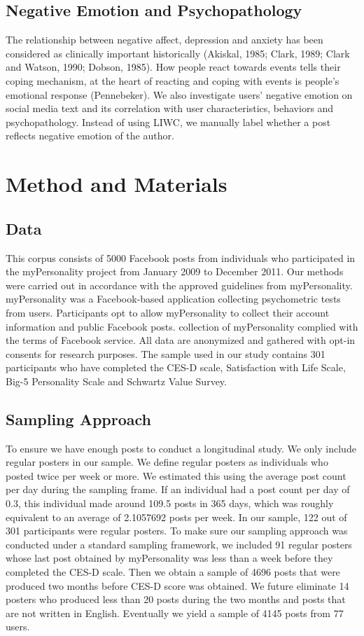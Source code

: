 \subsection{Negative Emotion and Psychopathology}

The relationship between negative affect, depression and anxiety has been considered as clinically important historically (Akiskal, 1985; Clark, 1989; Clark and Watson, 1990; Dobson, 1985). How people react towards events tells their coping mechanism, at the heart of reacting and coping with events is people's emotional response (Pennebeker). We also investigate users' negative emotion on social media text and its correlation with user characteristics, behaviors and psychopathology. Instead of using LIWC, we manually label whether a post reflects negative emotion of the author. 

\section{Method and Materials}
\subsection{Data}
This corpus consists of 5000 Facebook posts from individuals who participated in the myPersonality project from January 2009 to December 2011. Our methods were carried out in accordance with the approved guidelines from myPersonality. myPersonality was a Facebook-based application collecting psychometric tests from users. Participants opt to allow myPersonality to collect their account information and public Facebook posts. collection of myPersonality complied with the terms of Facebook service. All data are anonymized and gathered with opt-in consents for research purposes. The sample used in our study contains 301 participants who have completed the CES-D scale, Satisfaction with Life Scale, Big-5 Personality Scale and Schwartz Value Survey. 

\subsection{Sampling Approach}
To ensure we have enough posts to conduct a longitudinal study. We only include regular posters in our sample. We define regular posters as individuals who posted twice per week or more. We estimated this using the average post count per day during the sampling frame. If an individual had a post count per day of 0.3, this individual made around 109.5 posts in 365 days, which was roughly equivalent to an average of 2.1057692 posts per week. In our sample, 122 out of 301 participants were regular posters. To make sure our sampling approach was conducted under a standard sampling framework, we included 91 regular posters whose last post obtained by myPersonality was less than a week before they completed the CES-D scale. Then we  obtain a sample of 4696 posts that were produced two months before CES-D score was obtained.  We future eliminate 14 posters who produced less than 20 posts during the two months and posts that are not written in English. Eventually we yield a sample of 4145 posts from 77 users. 

